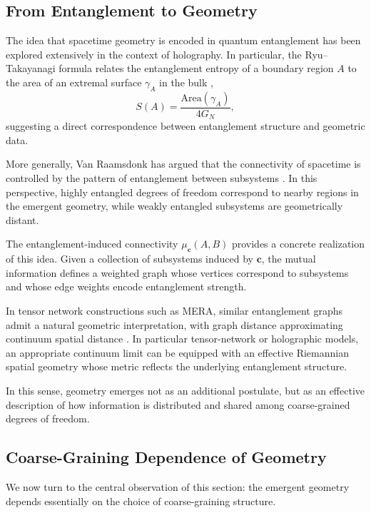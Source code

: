 \documentclass[12pt,a4paper,openany]{book}
\begin{document}
\subsection{From Entanglement to Geometry}

The idea that spacetime geometry is encoded in quantum entanglement has been explored extensively in the context of holography.
In particular, the Ryu--Takayanagi formula relates the entanglement entropy of a boundary region $A$ to the area of an extremal surface $\gamma_A$ in the bulk \cite{RyuTakayanagi2006},
\begin{equation}
S(A) = \frac{\mathrm{Area}(\gamma_A)}{4G_N},
\end{equation}
suggesting a direct correspondence between entanglement structure and geometric data.

More generally, Van Raamsdonk has argued that the connectivity of spacetime is controlled by the pattern of entanglement between subsystems \cite{VanRaamsdonk2010}.
In this perspective, highly entangled degrees of freedom correspond to nearby regions in the emergent geometry, while weakly entangled subsystems are geometrically distant.

The entanglement-induced connectivity $\mu_{\mathbf{c}}(A,B)$ provides a concrete realization of this idea.
Given a collection of subsystems induced by $\mathbf{c}$, the mutual information defines a weighted graph whose vertices correspond to subsystems and whose edge weights encode entanglement strength.

In tensor network constructions such as MERA, similar entanglement graphs admit a natural geometric interpretation, with graph distance approximating continuum spatial distance \cite{Swingle2012}.
In particular tensor-network or holographic models, an appropriate continuum limit can be equipped with an effective Riemannian spatial geometry whose metric reflects the underlying entanglement structure.

In this sense, geometry emerges not as an additional postulate, but as an effective description of how information is distributed and shared among coarse-grained degrees of freedom.

\subsection{Coarse-Graining Dependence of Geometry}

We now turn to the central observation of this section: the emergent geometry depends essentially on the choice of coarse-graining structure.
\end{document}
